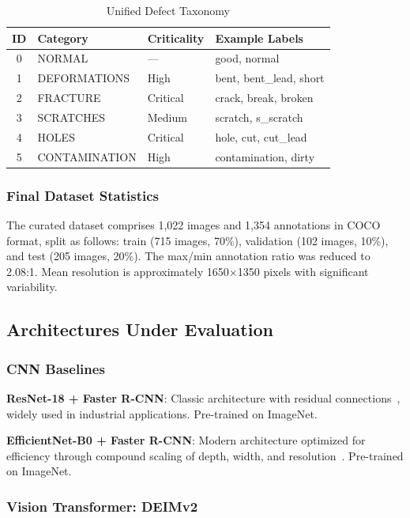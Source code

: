 \documentclass[journal,twoside,web]{ieeecolor}
\begin{document}
\begin{table}[htbp]
\centering
\caption{Unified Defect Taxonomy}
\label{tab:taxonomy}
\begin{tabular}{clll}
\toprule
\textbf{ID} & \textbf{Category} & \textbf{Criticality} & \textbf{Example Labels} \\
\midrule
0 & NORMAL & --- & good, normal \\
1 & DEFORMATIONS & High & bent, bent\_lead, short \\
2 & FRACTURE & Critical & crack, break, broken \\
3 & SCRATCHES & Medium & scratch, s\_scratch \\
4 & HOLES & Critical & hole, cut, cut\_lead \\
5 & CONTAMINATION & High & contamination, dirty \\
\bottomrule
\end{tabular}
\end{table}

\subsubsection{Final Dataset Statistics}

The curated dataset comprises 1,022 images and 1,354 annotations in COCO format, split as follows: train (715 images, 70\%), validation (102 images, 10\%), and test (205 images, 20\%). The max/min annotation ratio was reduced to 2.08:1. Mean resolution is approximately 1650$\times$1350 pixels with significant variability.

\subsection{Architectures Under Evaluation}

\subsubsection{CNN Baselines}

\textbf{ResNet-18 + Faster R-CNN}: Classic architecture with residual connections~\cite{he2016resnet}, widely used in industrial applications. Pre-trained on ImageNet.

\textbf{EfficientNet-B0 + Faster R-CNN}: Modern architecture optimized for efficiency through compound scaling of depth, width, and resolution~\cite{tan2019efficientnet}. Pre-trained on ImageNet.

\subsubsection{Vision Transformer: DEIMv2}
\end{document}
